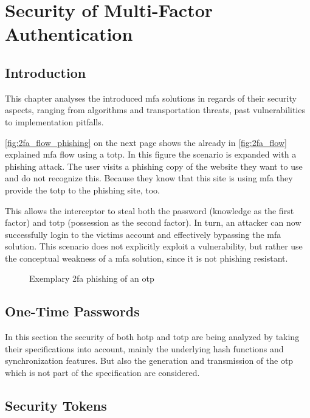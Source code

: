 \chapter{Security of Multi-Factor Authentication}

\section{Introduction}

This chapter analyses the introduced \gls{mfa} solutions in regards of their security aspects, ranging from algorithms and transportation threats, past vulnerabilities to implementation pitfalls.

\autoref{fig:2fa_flow_phishing} on the next page shows the already in \autoref{fig:2fa_flow} explained \gls{mfa} flow using a \gls{totp}. In this figure the scenario is expanded with a phishing attack. The user visits a phishing copy of the website they want to use and do not recognize this. Because they know that this site is using \gls{mfa} they provide the \gls{totp} to the phishing site, too.

This allows the interceptor to steal both the password (knowledge as the first factor) and \gls{totp} (possession as the second factor). In turn, an attacker can now successfully login to the victims account and effectively bypassing the \gls{mfa} solution. This scenario does not explicitly exploit a vulnerability, but rather use the conceptual weakness of a \gls{mfa} solution, since it is not phishing resistant.

\newpage

\begin{figure}[hbt]
	\centering
	
	\caption[Exemplary \gls{mfa} phishing of an \gls{otp}]{Exemplary \gls{2fa} phishing of an \gls{otp}\footnotemark}
	\label{fig:2fa_flow_phishing}
\end{figure}

\section{One-Time Passwords}
\label{sec:totp_sec}

In this section the security of both \gls{hotp} and \gls{totp} are being analyzed by taking their specifications into account, mainly the underlying hash functions and synchronization features. But also the generation and transmission of the \gls{otp} which is not part of the specification are considered.



\section{Security Tokens}
\label{sec:tokens}


